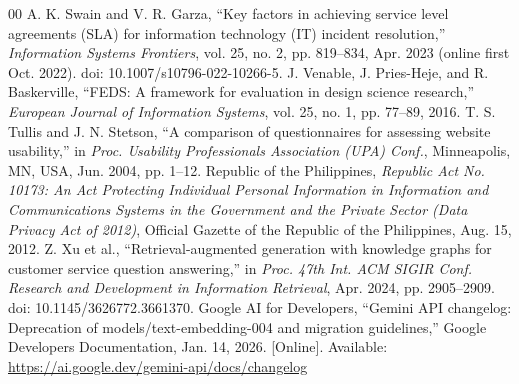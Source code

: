 \documentclass[conference]{IEEEtran}
\begin{document}
\begin{thebibliography}{00}
 A. K. Swain and V. R. Garza, ``Key factors in achieving service level agreements (SLA) for information technology (IT) incident resolution,'' \textit{Information Systems Frontiers}, vol. 25, no. 2, pp. 819--834, Apr. 2023 (online first Oct. 2022). doi: 10.1007/s10796-022-10266-5.
 J. Venable, J. Pries-Heje, and R. Baskerville, ``FEDS: A framework for evaluation in design science research,'' \textit{European Journal of Information Systems}, vol. 25, no. 1, pp. 77--89, 2016.
 T. S. Tullis and J. N. Stetson, ``A comparison of questionnaires for assessing website usability,'' in \textit{Proc. Usability Professionals Association (UPA) Conf.}, Minneapolis, MN, USA, Jun. 2004, pp. 1--12.
 Republic of the Philippines, \textit{Republic Act No. 10173: An Act Protecting Individual Personal Information in Information and Communications Systems in the Government and the Private Sector (Data Privacy Act of 2012)}, Official Gazette of the Republic of the Philippines, Aug. 15, 2012.
 Z. Xu et al., ``Retrieval-augmented generation with knowledge graphs for customer service question answering,'' in \textit{Proc. 47th Int. ACM SIGIR Conf. Research and Development in Information Retrieval}, Apr. 2024, pp. 2905--2909. doi: 10.1145/3626772.3661370.
 Google AI for Developers, ``Gemini API changelog: Deprecation of models/text-embedding-004 and migration guidelines,'' Google Developers Documentation, Jan. 14, 2026. [Online]. Available: \url{https://ai.google.dev/gemini-api/docs/changelog}
\end{thebibliography}
\end{document}
